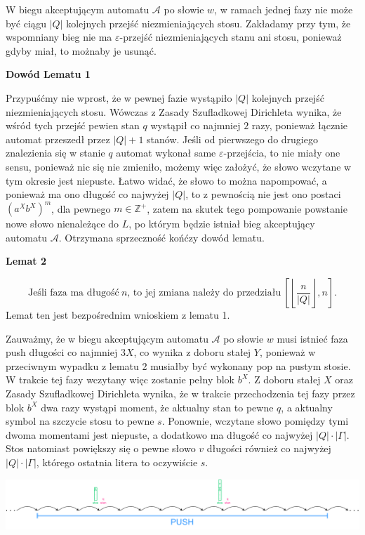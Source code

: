 \documentclass[12pt]{article}
\begin{document}
	W biegu akceptującym automatu \(\mathcal{A}\) po słowie \(w\), w ramach
	jednej fazy nie może być ciągu \(\left| Q \right|\) kolejnych przejść
	niezmieniających stosu. Zakładamy przy tym, że wspomniany bieg nie ma
	\(\varepsilon\)-przejść niezmieniających stanu ani stosu, ponieważ gdyby
	miał, to możnaby je usunąć.
	
	\medskip
	
	\textbf{Dowód Lematu 1}
	
	Przypuśćmy nie wprost, że w pewnej fazie wystąpiło \(\left| Q \right|\)
	kolejnych przejść niezmieniających stosu. Wówczas z Zasady Szufladkowej
	Dirichleta wynika, że wśród tych przejść pewien stan \(q\) wystąpił co
	najmniej \(2\) razy, ponieważ łącznie automat przeszedł przez \(\left| Q
	\right| + 1\) stanów. Jeśli od pierwszego do drugiego znalezienia się w
	stanie \(q\) automat wykonał same \(\varepsilon\)-przejścia, to nie miały
	one sensu, ponieważ nic się nie zmieniło, możemy więc założyć, że słowo
	wczytane w tym okresie jest niepuste. Łatwo widać, że słowo to można
	napompować, a ponieważ ma ono długość co najwyżej \(\left| Q \right|\), to z
	pewnością nie jest ono postaci \(\left( a^{X} b^{X} \right) ^ m\), dla
	pewnego \(m \in \mathbb{Z}^{+}\), zatem na skutek tego pompowanie powstanie
	nowe słowo nienależące do \(L\), po którym będzie istniał bieg akceptujący
	automatu \(\mathcal{A}\). Otrzymana sprzeczność końćzy dowód lematu.
	
	\medskip
	
	\textbf{Lemat 2}
	
	\[ \text{Jeśli faza ma długość} \ n
	\text{, to jej zmiana należy do przedziału} \ \left[ \left\lfloor
	\frac{n}{\left| Q \right|} \right\rfloor, n \right] \text{.} \]
	Lemat ten jest bezpośrednim wnioskiem z lematu 1.
	
	\medskip
	
	Zauważmy, że w biegu akceptującym automatu \(\mathcal{A}\) po słowie \(w\)
	musi istnieć faza push długości co najmniej \(3X\), co wynika z doboru
	stałej \(Y\), ponieważ w przeciwnym wypadku z lematu 2 musiałby być wykonany
	pop na pustym stosie. W trakcie tej fazy wczytany więc zostanie pełny blok
	\(b^{X}\). Z doboru stałej \(X\) oraz Zasady Szufladkowej Dirichleta wynika,
	że w trakcie przechodzenia tej fazy przez blok \(b^{X}\) dwa razy wystąpi
	moment, że aktualny stan to pewne \(q\), a aktualny symbol na szczycie stosu
	to pewne \(s\). Ponownie, wczytane słowo pomiędzy tymi dwoma momentami jest
	niepuste, a dodatkowo ma długość co najwyżej \(\left| Q \right| \cdot \left|
	\Gamma \right|\). Stos natomiast powiększy się o pewne słowo \(v\) długości
	również co najwyżej \(\left| Q \right| \cdot \left| \Gamma \right|\),
	którego ostatnia litera to oczywiście \(s\).
	\begin{center}
		\includegraphics[width = 0.9 \textwidth]{./image-1.pdf}
	\end{center}
	
\end{document}
